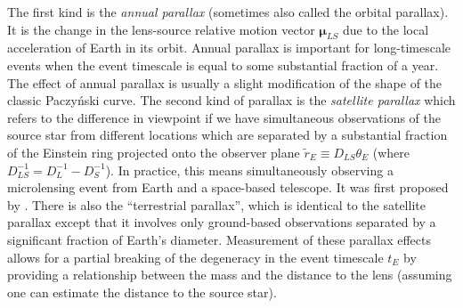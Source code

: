 \documentclass[12pt,dvipsnames]{report}
\begin{document}
The first kind is the \emph{annual
    parallax} (sometimes also called the orbital parallax). 
It is the change in the  
lens-source relative motion vector $\boldsymbol\mu_{LS}$ due to the local
acceleration of Earth in its orbit. Annual parallax is important for long-timescale events
when the event timescale is equal to some substantial fraction of a year. The
effect of annual parallax is usually a slight modification of the shape of the
classic Paczy\'nski curve.
The second kind of parallax is the \emph{satellite parallax} which refers to the
difference in viewpoint if we have simultaneous observations of the source
star from different locations which are separated by a substantial fraction of the
Einstein ring projected onto the observer plane $\tilde{r}_E\equiv
    D_{LS}\theta_E$ (where $D_{LS}^{-1}=D_L^{-1} - D_S^{-1}$). In practice, this
means simultaneously observing a microlensing event from Earth and a space-based telescope.
It was first proposed by \citet{1966MNRAS.134..315R}. There is
also the ``terrestrial parallax'', which is identical to the satellite parallax
except that it involves only ground-based observations separated by a significant 
fraction of Earth's diameter. Measurement of these parallax effects allows
for a partial breaking of the degeneracy in the event timescale $t_E$ by
providing a relationship between the mass and the distance to the lens
(assuming one can estimate the distance to the source star).
\end{document}
